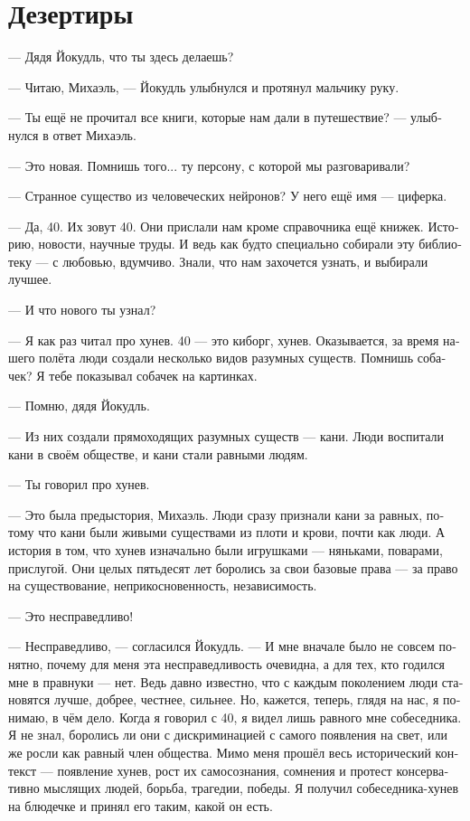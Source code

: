 \documentclass[a4paper,10pt,fleqn]{book}\usepackage{polyglossia}\setdefaultlanguage[babelshorthands=true]{russian}\setotherlanguage{english}\defaultfontfeatures{Ligatures=TeX,Mapping=tex-text}\usepackage{xcolor}\newcommand{\ml}[3]{#2}
\begin{document}
\section{Дезертиры}

--- Дядя Йокудль, что ты здесь делаешь?

--- Читаю, Михаэль, --- Йокудль улыбнулся и протянул мальчику руку.

--- Ты ещё не прочитал все книги, которые нам дали в путешествие? --- улыбнулся в ответ Михаэль.

--- Это новая.
Помнишь того... ту персону, с которой мы разговаривали?

--- Странное существо из человеческих нейронов?
У него ещё имя --- циферка.

--- Да, 40.
Их зовут 40.
Они прислали нам кроме справочника ещё книжек.
Историю, новости, научные труды.
И ведь как будто специально собирали эту библиотеку --- с любовью, вдумчиво.
Знали, что нам захочется узнать, и выбирали лучшее.

--- И что нового ты узнал?

--- Я как раз читал про хунев.
40 --- это киборг, хунев.
Оказывается, за время нашего полёта люди создали несколько видов разумных существ.
Помнишь собачек?
Я тебе показывал собачек на картинках.

--- Помню, дядя Йокудль.

--- Из них создали прямоходящих разумных существ --- кани.
Люди воспитали кани в своём обществе, и кани стали равными людям.

--- Ты говорил про хунев.

--- Это была предыстория, Михаэль.
Люди сразу признали кани за равных, потому что кани были живыми существами из плоти и крови, почти как люди.
А история в том, что хунев изначально были игрушками --- няньками, поварами, прислугой.
Они целых пятьдесят лет боролись за свои базовые права --- за право на существование, неприкосновенность, независимость.

--- Это несправедливо!

--- Несправедливо, --- согласился Йокудль.
--- И мне вначале было не совсем понятно, почему для меня эта несправедливость очевидна, а для тех, кто годился мне в правнуки --- нет.
Ведь давно известно, что с каждым поколением люди становятся лучше, добрее, честнее, сильнее.
Но, кажется, теперь, глядя на нас, я понимаю, в чём дело.
Когда я говорил с 40, я видел лишь равного мне собеседника.
Я не знал, боролись ли они с дискриминацией с самого появления на свет, или же росли как равный член общества.
Мимо меня прошёл весь исторический контекст --- появление хунев, рост их самосознания, сомнения и протест консервативно мыслящих людей, борьба, трагедии, победы.
Я получил собеседника-хунев на блюдечке и принял его таким, какой он есть.
\end{document}
